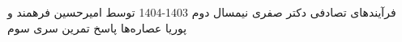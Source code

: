 \documentclass[11pt, a4, twoside]{article}
\begin{document}
	\pagestyle{empty}
	\heading
	{فرآیندهای تصادفی}
	{دکتر صفری}
	{نیمسال دوم 1403-1404}
    {توسط امیرحسین فرهمند و پوریا عصاره‌ها}
    {پاسخ تمرین سری سوم}
	\begin{problem} %
	\end{problem}
	
	\begin{problem} %
	\end{problem}
	
	\begin{problem} %
	\end{problem}
	
	\begin{problem} %
	\end{problem}
	
	\begin{problem} %
	\end{problem}
	
\end{document}
